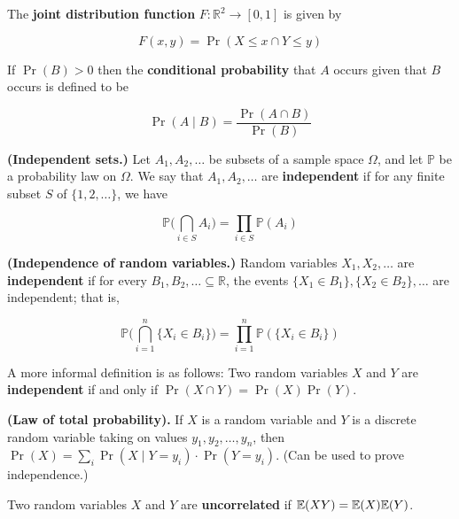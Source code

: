 \begin{definition}The \textbf{joint distribution function} \(F: \mathbb{R}^2 \to [0, 1]\) is given by

\[
F(x, y) = \Pr(X \leq x \cap Y \leq y)
\]\end{definition}

\begin{definition}If \(\Pr(B) > 0\) then the \textbf{conditional probability} that \(A\) occurs given that \(B\) occurs is defined to be

\[
\Pr(A \mid B) = \frac{\Pr(A \cap B)}{\Pr(B)}
\]\end{definition}

\begin{definition}\textbf{(Independent sets.)} Let \(A_1, A_2, \ldots\) be subsets of a sample space \(\Omega\), and let \(\mathbb{P}\) be a probability law on \(\Omega\). We say that \(A_1, A_2, \ldots\) are \textbf{independent} if for any finite subset \(S\) of \(\{1, 2, \ldots\}\), we have

\[
\mathbb{P}\bigg( \bigcap_{i \in S} A_i \bigg) = \prod_{i \in S} \mathbb{P}(A_i)
\]

\end{definition}

\begin{definition}\textbf{(Independence of random variables.)} Random variables \(X_1, X_2, \ldots\) are \textbf{independent} if for every \(B_1, B_2, \ldots \subseteq \mathbb{R}\), the events \(\{X_1 \in B_1\}, \{X_2 \in B_2\}, \ldots\) are independent; that is, 

\[
\mathbb{P} \bigg( \bigcap_{i=1}^n \{X_i \in B_i\} \bigg) = \prod_{i=1}^n \mathbb{P}(\{X_i \in B_i\})
\]
\end{definition}

\begin{remark}A more informal definition is as follows: Two random variables \(X\) and \(Y\) are \textbf{independent} if and only if \(\Pr(X \cap Y) = \Pr(X) \Pr(Y)\).\end{remark}

\begin{theorem} \textbf{(Law of total probability).} If \(X\) is a random variable and \(Y\) is a discrete random variable taking on values \(y_1, y_2, \ldots, y_n\), then \(\Pr(X) = \sum_i \Pr(X \mid Y = y_i) \cdot \Pr(Y = y_i)\). (Can be used to prove independence.)\end{theorem}

\begin{definition}Two random variables \(X\) and \(Y\) are \textbf{uncorrelated} if \(\E(XY) = \E(X) \E(Y)\).\end{definition} 

